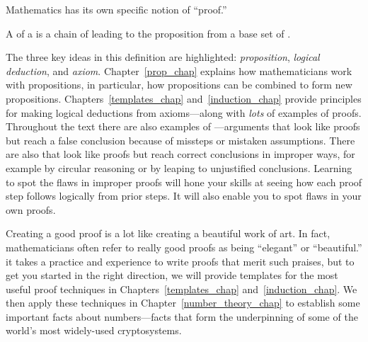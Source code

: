 Mathematics has its own specific notion of ``proof.''

\begin{definition*}
A  of a  is a chain of  leading to the proposition from a base set of .
\end{definition*}

The three key ideas in this definition are highlighted:
\emph{proposition}, \emph{logical deduction}, and \emph{axiom}.
Chapter~\ref{prop_chap} explains how mathematicians work with  propositions, in particular, how propositions can be combined
to form new propositions.  Chapters~\ref{templates_chap}
and~\ref{induction_chap} provide principles for making logical deductions
from axioms---along with \emph{lots} of examples of proofs.  Throughout
the text there are also examples of ---arguments that
look like proofs but reach a false conclusion because of missteps or
mistaken assumptions.   There are also
 that look like proofs but reach correct
 conclusions in improper ways, for example
by circular reasoning or by leaping to unjustified conclusions.  Learning
to spot the flaws in improper proofs will hone your skills at seeing how
each proof step follows logically from prior steps.  It will also enable
you to spot flaws in your own proofs.

Creating a good proof is a lot like creating a beautiful work of art.  In
fact, mathematicians often refer to really good proofs as being
``elegant'' or ``beautiful.''  it takes a practice and experience to write
proofs that merit such praises,  but to get you started in
the right direction, we will provide templates for the most useful proof
techniques in Chapters~\ref{templates_chap} and~\ref{induction_chap}.  We
then apply these techniques in Chapter~\ref{number_theory_chap} to
establish some important facts about numbers---facts that form the
 underpinning of some of the world's most
widely-used cryptosystems.



\endinput
